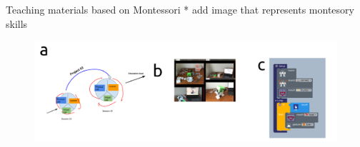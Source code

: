 {
\begin{frame}{Teaching materials based on Montessori}
* add image that represents montesory skills
      \begin{figure}
        \centering
        \includegraphics[width=1.0\textwidth]{./figures/teaching-materials/versions/drawing-v01.png}
      \end{figure}
\end{frame}
}
